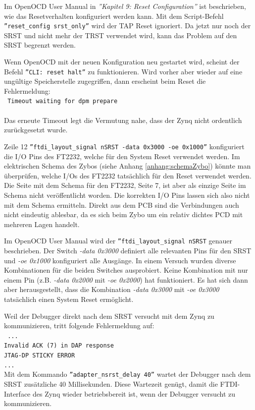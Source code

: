 Im OpenOCD User Manual\cite{bib:OpenOCDDoku} in \textit{''Kapitel 9: Reset Configuration''} ist beschrieben, wie das Resetverhalten konfiguriert werden kann.
Mit dem Script-Befehl \texttt{''reset\_config srst\_only''} wird der TAP Reset ignoriert.
Da jetzt nur noch der SRST und nicht mehr der TRST verwendet wird, kann das Problem auf den SRST begrenzt werden.

Wenn OpenOCD mit der neuen Konfiguration neu gestartet wird, scheint der Befehl \texttt{''CLI: reset halt''} zu funktionieren.
Wird vorher aber wieder auf eine ungültige Speicherstelle zugegriffen, dann erscheint beim Reset die Fehlermeldung:\\
\texttt{
Timeout waiting for dpm prepare\\
}\\
Das erneute Timeout legt die Vermutung nahe, dass der Zynq nicht ordentlich zurückgesetzt wurde.

Zeile 12 \texttt{''ftdi\_layout\_signal nSRST -data 0x3000 -oe 0x1000''} konfiguriert die I/O Pins des FT2232, welche für den System Reset verwendet werden.
Im elektrischen Schema des Zybos (siehe Anhang \ref{anhang:schemaZybo}) könnte man überprüfen, welche I/Os des FT2232 tatsächlich für den Reset verwendet werden.
Die Seite mit dem Schema für den FT2232, Seite 7, ist aber als einzige Seite im Schema nicht veröffentlicht worden.
Die korrekten I/O Pins lassen sich also nicht mit dem Schema ermitteln.
Direkt aus dem PCB sind die Verbindungen auch nicht eindeutig ablesbar, da es sich beim Zybo um ein relativ dichtes PCD mit mehreren Lagen handelt.

Im OpenOCD User Manual\cite{bib:OpenOCDDoku} wird der \texttt{''ftdi\_layout\_signal nSRST} genauer beschrieben.
Der Switch \textit{-data 0x3000} definiert alle relevanten Pins für den SRST und \textit{-oe 0x1000} konfiguriert alle Ausgänge.
In einem Versuch wurden diverse Kombinationen für die beiden Switches ausprobiert.
Keine Kombination mit nur einem Pin (z.B. \textit{-data 0x2000} mit \textit{-oe 0x2000}) hat funktioniert.
Es hat sich dann aber herausgestellt, dass die Kombination \textit{-data 0x3000} mit \textit{-oe 0x3000} tatsächlich einen System Reset ermöglicht.

Weil der Debugger direkt nach dem SRST versucht mit dem Zynq zu kommunizieren, tritt folgende Fehlermeldung auf:\\
\texttt{
...\\
Invalid ACK (7) in DAP response\\
JTAG-DP STICKY ERROR\\
...\\
}
Mit dem Kommando \texttt{''adapter\_nsrst\_delay 40''} wartet der Debugger nach dem SRST zusätzliche 40 Millisekunden.
Diese Wartezeit genügt, damit die FTDI-Interface des Zynq wieder betriebsbereit ist, wenn der Debugger versucht zu kommunizieren.



